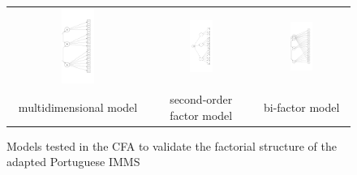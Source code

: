 \begin{figure}[htb]
 \caption{Models tested in the CFA to validate the factorial structure of the adapted Portuguese IMMS}
 \label{fig:imms-models-cfa}
 \centering
 \begin{tabular}{ccc}
 \includegraphics[width=0.25\textwidth]{images/appendix/imms-multidimensional-model.png} &
 \includegraphics[width=0.25\textwidth]{images/appendix/imms-second-order-factor-model} &
 \includegraphics[width=0.25\textwidth]{images/appendix/imms-bi-factor-model.png} \\
 {\scriptsize multidimensional model} & {\scriptsize second-order factor model} & {\scriptsize bi-factor model} \\
 \end{tabular}
 \fautor
\end{figure}
\newpage

